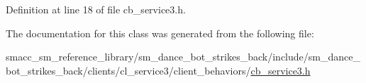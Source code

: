 Definition at line 18 of file cb\+\_\+service3.\+h.



The documentation for this class was generated from the following file\+:\begin{DoxyCompactItemize}
\item 
smacc\+\_\+sm\+\_\+reference\+\_\+library/sm\+\_\+dance\+\_\+bot\+\_\+strikes\+\_\+back/include/sm\+\_\+dance\+\_\+bot\+\_\+strikes\+\_\+back/clients/cl\+\_\+service3/client\+\_\+behaviors/\hyperlink{strikes__back_2include_2sm__dance__bot__strikes__back_2clients_2cl__service3_2client__behaviors_2cb__service3_8h}{cb\+\_\+service3.\+h}\end{DoxyCompactItemize}
